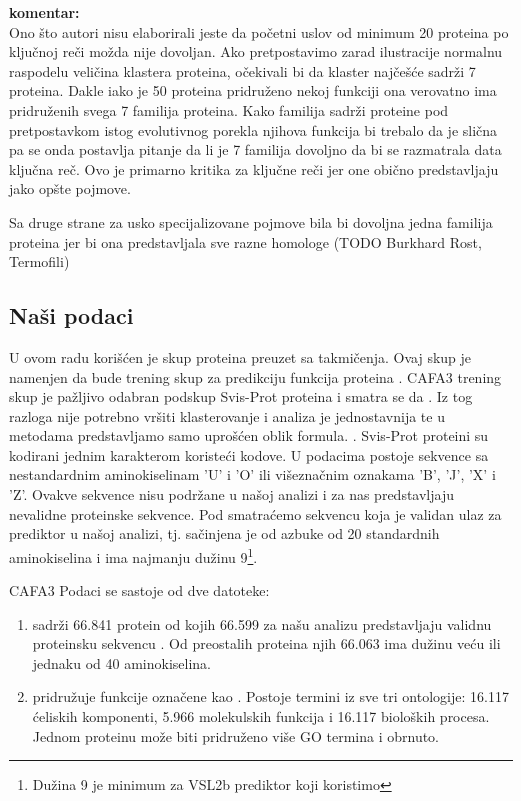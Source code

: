 \textbf{komentar:} \\
Ono što autori nisu elaborirali jeste da početni uslov od minimum 20 proteina
po ključnoj reči možda nije dovoljan. Ako pretpostavimo zarad ilustracije
normalnu raspodelu veličina klastera proteina, očekivali bi da klaster najčešće
sadrži 7 proteina. Dakle iako je 50 proteina pridruženo nekoj funkciji ona
verovatno ima pridruženih svega 7 familija proteina. Kako familija sadrži
proteine pod pretpostavkom istog evolutivnog porekla njihova funkcija bi
trebalo da je slična pa se onda postavlja pitanje da li je 7 familija dovoljno
da bi se razmatrala data ključna reč. Ovo je primarno kritika za ključne reči
jer one obično predstavljaju jako opšte pojmove.

Sa druge strane za usko specijalizovane pojmove bila bi dovoljna jedna familija
proteina jer bi ona predstavljala sve razne homologe (TODO Burkhard Rost,
Termofili)

\subsection{Naši podaci}

U ovom radu korišćen je skup proteina preuzet sa  takmičenja.
Ovaj skup je namenjen da bude trening skup za predikciju funkcija proteina
\parencite{CAFA}.  CAFA3 trening skup je pažljivo odabran podskup Svis-Prot
proteina i smatra se da  \parencite{??}.
Iz tog razloga nije potrebno vršiti klasterovanje i analiza je jednostavnija te
u metodama predstavljamo samo uprošćen oblik formula.  .  Svis-Prot proteini su
kodirani jednim karakterom koristeći  kodove.  U podacima
postoje sekvence sa nestandardnim aminokiselinam 'U' i 'O' ili višeznačnim
oznakama 'B', 'J', 'X' i 'Z'.  Ovakve sekvence nisu podržane u našoj analizi i
za nas predstavljaju nevalidne proteinske sekvence. Pod  smatraćemo sekvencu koja je validan ulaz za prediktor u
našoj analizi, tj. sačinjena je od azbuke od 20 standardnih aminokiselina i ima
najmanju dužinu 9\footnote{ Dužina 9 je minimum za VSL2b prediktor koji
koristimo}.

CAFA3 Podaci se sastoje od dve datoteke:
\begin{enumerate}
  \item {}  sadrži 66.841 protein od kojih 66.599
    za našu analizu predstavljaju validnu proteinsku sekvencu . Od preostalih
    proteina njih 66.063 ima dužinu veću ili jednaku od 40 aminokiselina.
  \item {} pridružuje funkcije označene kao
     . Postoje termini iz sve tri
    ontologije: 16.117 ćeliskih komponenti, 5.966 molekulskih funkcija i 16.117
    bioloških procesa. Jednom proteinu može biti pridruženo više GO termina i
    obrnuto.
\end{enumerate}

